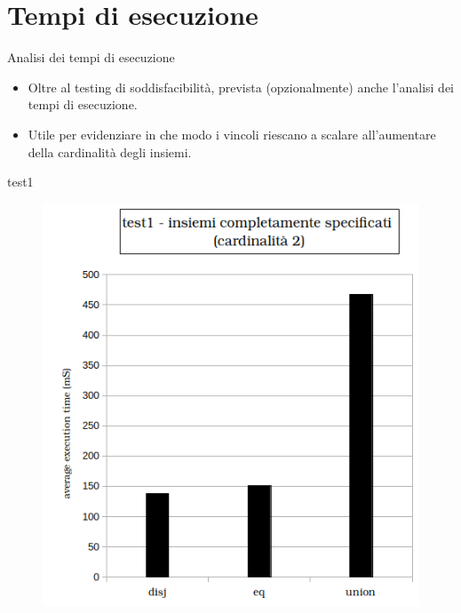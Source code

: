 \documentclass{beamer}
\begin{document}
\section{Tempi di esecuzione}


\begin{frame}{Analisi dei tempi di esecuzione}
  		
        {
        	\begin{block}{ }
        	\begin{itemize}
        	\setlength\itemsep{2em}
        	\item Oltre al testing di soddisfacibilit\`a, prevista (opzionalmente) anche l'analisi dei tempi di esecuzione.
       	 	\item Utile per evidenziare in che modo i vincoli riescano a scalare all'aumentare della cardinalit\`a degli insiemi.
			\end{itemize}        
        	\end{block}	
        }

\end{frame}

\begin{frame}{test1}
	\begin{figure}
	\includegraphics[scale=0.5]{histogram_test1.png}
	
	\end{figure}

\end{frame}
\end{document}
